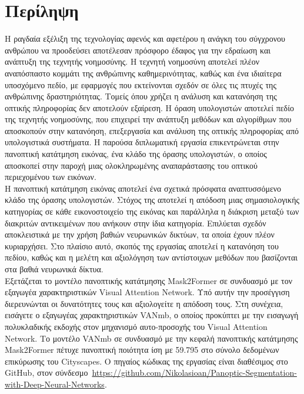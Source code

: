 \documentclass[12pt]{article}
\numberwithin{equation}{section}
\begin{document}
\newpage

\section*{Περίληψη}

Η ραγδαία εξέλιξη της τεχνολογίας αφενός και αφετέρου η ανάγκη του σύγχρονου ανθρώπου να προοδεύσει αποτέλεσαν πρόσφορο έδαφος για την εδραίωση και ανάπτυξη της τεχνητής νοημοσύνης. Η τεχνητή νοημοσύνη αποτελεί πλέον αναπόσπαστο κομμάτι της ανθρώπινης καθημερινότητας, καθώς και ένα ιδιαίτερα υποσχόμενο πεδίο, με εφαρμογές που εκτείνονται σχεδόν σε όλες τις πτυχές της ανθρώπινης δραστηριότητας. Τομείς όπου χρήζει η ανάλυση και κατανόηση της οπτικής πληροφορίας δεν αποτελούν εξαίρεση. Η όραση υπολογιστών αποτελεί πεδίο της τεχνητής νοημοσύνης, που επιχειρεί την ανάπτυξη μεθόδων και αλγορίθμων που αποσκοπούν στην κατανόηση, επεξεργασία και ανάλυση της οπτικής πληροφορίας από υπολογιστικά συστήματα. Η παρούσα διπλωματική εργασία επικεντρώνεται στην πανοπτική κατάτμηση εικόνας, ένα κλάδο της όρασης υπολογιστών, ο οποίος αποσκοπεί στην παροχή μιας ολοκληρωμένης αναπαράστασης του οπτικού περιεχομένου των εικόνων.\\

Η πανοπτική κατάτμηση εικόνας αποτελεί ένα σχετικά πρόσφατα αναπτυσσόμενο κλάδο της όρασης υπολογιστών. Στόχος της αποτελεί η απόδοση μιας σημασιολογικής κατηγορίας σε κάθε εικονοστοιχείο της εικόνας και παράλληλα η διάκριση μεταξύ των διακριτών αντικειμένων που ανήκουν στην ίδια κατηγορία. Επιλύεται σχεδόν αποκλειστικά με την χρήση βαθιών νευρωνικών δικτύων, τα οποία έχουν πλέον κυριαρχήσει.  Στο πλαίσιο αυτό, σκοπός της εργασίας αποτελεί η κατανόηση του πεδίου, καθώς και η μελέτη και αξιολόγηση των αντίστοιχων μεθόδων που βασίζονται στα βαθιά νευρωνικά δίκτυα. \\

Εξετάζεται το μοντέλο πανοπτικής κατάτμησης Mask2Former σε συνδυασμό με τον εξαγωγέα χαρακτηριστικών Visual Attention Network. Υπό αυτήν την προσέγγιση διερευνώνται οι δυνατότητες τους και αξιολογείτε η απόδοση τους. Στη συνέχεια, εισάγετε ο εξαγωγέας χαρακτηριστικών VANmb, ο οποίος προκύπτει με την εισαγωγή πολυκλαδικής εκδοχής στον μηχανισμό αυτο-προσοχής του Visual Attention Network. Το μοντέλο VANmb σε συνδυασμό με την κεφαλή πανοπτικής κατάτμησης Mask2Former πέτυχε πανοπτική ποιότητα ίση με 59.795 στο σύνολο δεδομένων επικύρωσης του Cityscapes. Ο πηγαίος κώδικας της εργασίας είναι διαθέσιμος στο GitΗub, στον σύνδεσμο~\url{https://github.com/Nikolasioan/Panoptic-Segmentation-with-Deep-Neural-Networks}.\\
\end{document}
